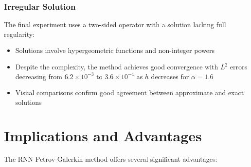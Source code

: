 \documentclass[11pt]{article}
\begin{document}
\subsubsection{Irregular Solution}
The final experiment uses a two-sided operator with a solution lacking full regularity:
\begin{itemize}
    \item Solutions involve hypergeometric functions and non-integer powers
    \item Despite the complexity, the method achieves good convergence with $L^2$ errors decreasing from $6.2 \times 10^{-3}$ to $3.6 \times 10^{-4}$ as $h$ decreases for $\alpha = 1.6$
    \item Visual comparisons confirm good agreement between approximate and exact solutions
\end{itemize}

\section{Implications and Advantages}

The RNN Petrov-Galerkin method offers several significant advantages:
\end{document}
